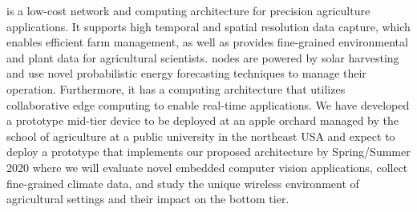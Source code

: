 \myname{} is a low-cost network and computing architecture for precision agriculture applications. It supports high temporal and spatial resolution data capture, which enables efficient farm management, as well as provides fine-grained environmental and plant data for agricultural scientists. \myname{} nodes are powered by solar harvesting and use novel probabilistic energy forecasting techniques to manage their operation. Furthermore, it has a computing architecture that utilizes collaborative edge computing to enable real-time applications.  We have developed a prototype mid-tier device to be deployed at an apple orchard managed by the school of agriculture at a public university in the northeast USA and expect to deploy a prototype that implements our proposed architecture by Spring/Summer 2020 where we will evaluate novel embedded computer vision applications, collect fine-grained climate data, and study the unique wireless environment of agricultural settings and their impact on the bottom tier.

\pagebreak

